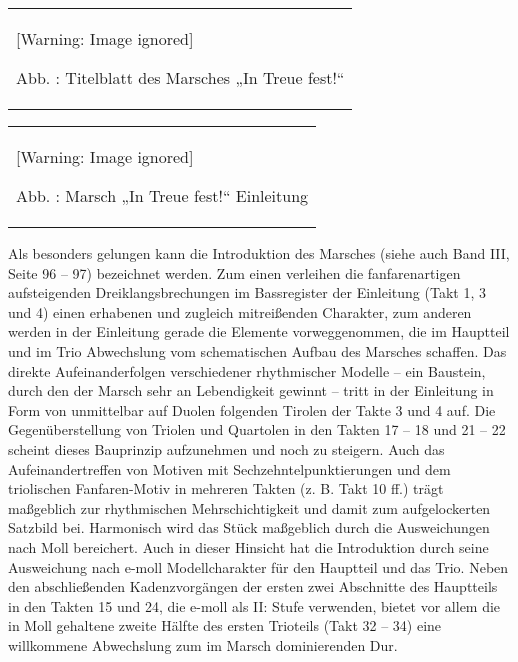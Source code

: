 \documentclass[a4paper]{article}
\newcounter{Abb}
\renewcommand\theAbb{\arabic{Abb}}
\begin{document}
\begin{center}
\begin{minipage}{5.884cm}
\begin{flushleft}
\tablefirsthead{}
\tablehead{}
\tabletail{}
\tablelasttail{}
\begin{supertabular}{m{5.684cm}}
  [Warning: Image ignored] %
 
Abb. \stepcounter{Abb}{\theAbb}: Titelblatt des Marsches „In Treue
fest!“\\
\end{supertabular}
\end{flushleft}
\end{minipage}
\end{center}
\begin{center}
\tablefirsthead{}
\tablehead{}
\tabletail{}
\tablelasttail{}
\begin{supertabular}{m{10.502cm}}
  [Warning: Image ignored] %
 
Abb. \stepcounter{Abb}{\theAbb}: Marsch „In Treue fest!“ Einleitung\\
\end{supertabular}
\end{center}
Als besonders gelungen kann die Introduktion des Marsches (siehe auch
Band III, Seite 96 – 97) bezeichnet werden. Zum einen verleihen die
fanfarenartigen aufsteigenden Dreiklangsbrechungen im Bassregister der
Einleitung (Takt 1, 3 und 4) einen erhabenen und zugleich mitreißenden
Charakter, zum anderen werden in der Einleitung gerade die Elemente
vorweggenommen, die im Hauptteil und im Trio Abwechslung vom
schematischen Aufbau des Marsches schaffen. Das direkte
Aufeinanderfolgen verschiedener rhythmischer Modelle – ein Baustein,
durch den der Marsch sehr an Lebendigkeit gewinnt – tritt in der
Einleitung in Form von unmittelbar auf Duolen folgenden Tirolen der
Takte 3 und 4 auf. Die Gegenüberstellung von Triolen und Quartolen in
den Takten 17 – 18 und 21 – 22 scheint dieses Bauprinzip aufzunehmen
und noch zu steigern. Auch das Aufeinandertreffen von Motiven mit
Sechzehntelpunktierungen und dem triolischen Fanfaren-Motiv in mehreren
Takten (z. B. Takt 10 ff.) trägt maßgeblich zur rhythmischen
Mehrschichtigkeit und damit zum aufgelockerten Satzbild bei. Harmonisch
wird das Stück maßgeblich durch die Ausweichungen nach Moll bereichert.
Auch in dieser Hinsicht hat die Introduktion durch seine Ausweichung
nach e-moll Modellcharakter für den Hauptteil und das Trio. Neben den
abschließenden Kadenzvorgängen der ersten zwei Abschnitte des
Hauptteils in den Takten 15 und 24, die e-moll als II: Stufe verwenden,
bietet vor allem die in Moll gehaltene zweite Hälfte des ersten
Trioteils (Takt 32 – 34) eine willkommene Abwechslung zum im Marsch
dominierenden Dur. 
\end{document}
